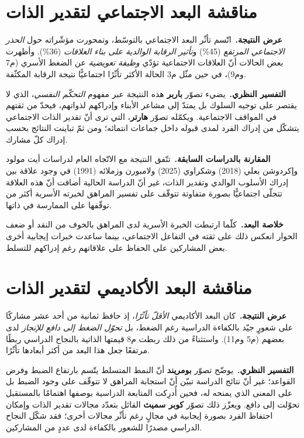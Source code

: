 \section{مناقشة البعد الاجتماعي لتقدير الذات}
\noindent\textbf{عرض النتيجة.}\ اتّسم تأثّر البعد الاجتماعي بالتوسّط، وتمحورت مؤشّراته حول
\emph{الحذر الاجتماعي المرتفع} (45\%) و\emph{تأثير الرقابة الوالدية على بناء العلاقات} (36\%).
وأظهرت بعض الحالات أنّ العلاقات الاجتماعية تؤدّي \emph{وظيفة تعويضية} عن الضغط الأسري (م7 وم9)،
في حين مثّل م3 الحالة الأكثر تأثّرًا اجتماعيًّا نتيجة الرقابة المكثّفة.

\noindent\textbf{التفسير النظري.}\ يضيء تصوّر \textbf{باربر} هذه النتيجة عبر مفهوم \emph{التحكّم
النفسي}، الذي لا يقتصر على توجيه السلوك بل يمتدّ إلى مشاعر الأبناء وإدراكهم لذواتهم، فيحدّ من
ثقتهم في المواقف الاجتماعية. ويكمّله تصوّر \textbf{هارتر}، التي ترى أنّ تقدير الذات الاجتماعي
يتشكّل من إدراك الفرد لمدى قبوله داخل جماعات انتمائه؛ ومن ثمّ تباينت النتائج بحسب إدراك كلّ
مشارك.

\noindent\textbf{المقارنة بالدراسات السابقة.}\ تتّفق النتيجة مع الاتّجاه العام لدراسات أيت مولود
وإكردوشن بعلي (2018) وشكراوي (2025) ولامبورن وزملائه (1991) في وجود علاقة بين إدراك الأسلوب
الوالدي وتقدير الذات، غير أنّ الدراسة الحالية أضافت أنّ هذه العلاقة تتجلّى اجتماعيًّا بصورة
متفاوتة تتوقّف على تفسير المراهق لخبرته الأسرية أكثر من توقّفها على الممارسة في ذاتها.

\noindent\textbf{خلاصة البعد.}\ كلّما ارتبطت الخبرة الأسرية لدى المراهق بالخوف من النقد أو ضعف
الحوار انعكس ذلك على ثقته في التفاعل الاجتماعي، بينما ساعدت خبرات إيجابية أخرى بعض المشاركين على
الحفاظ على علاقاتهم رغم إدراكهم للتسلط.

\section{مناقشة البعد الأكاديمي لتقدير الذات}
\noindent\textbf{عرض النتيجة.}\ كان البعد الأكاديمي \emph{الأقلّ تأثّرًا}، إذ حافظ ثمانية من أحد
عشر مشاركًا على شعورٍ جيّد بالكفاءة الدراسية رغم الضغط، بل \emph{تحوّل الضغط إلى دافع للإنجاز}
لدى بعضهم (م5 وم11). واستثناءً من ذلك ربطت م8 قيمتها الذاتية بالنجاح الدراسي ربطًا مرتفعًا جعل
هذا البعد من أكثر أبعادها تأثّرًا.

\noindent\textbf{التفسير النظري.}\ يوضّح تصوّر \textbf{بومريند} أنّ النمط المتسلط يتّسم بارتفاع
الضبط وفرض القواعد؛ غير أنّ نتائج الدراسة تبيّن أنّ استجابة المراهق لا تتوقّف على وجود الضبط بل
على المعنى الذي يمنحه له، فحين أُدرِكت المتابعة الدراسية بوصفها اهتمامًا بالمستقبل تحوّلت إلى
دافع. ويعزّز ذلك تصوّر \textbf{كوبر سميث} القائل بتعدّد مجالات تقدير الذات وإمكان احتفاظ الفرد
بصورة إيجابية في مجالٍ رغم تأثّر مجالات أخرى؛ فقد شكّل النجاح الدراسي مصدرًا للشعور بالكفاءة لدى
عددٍ من المشاركين.

